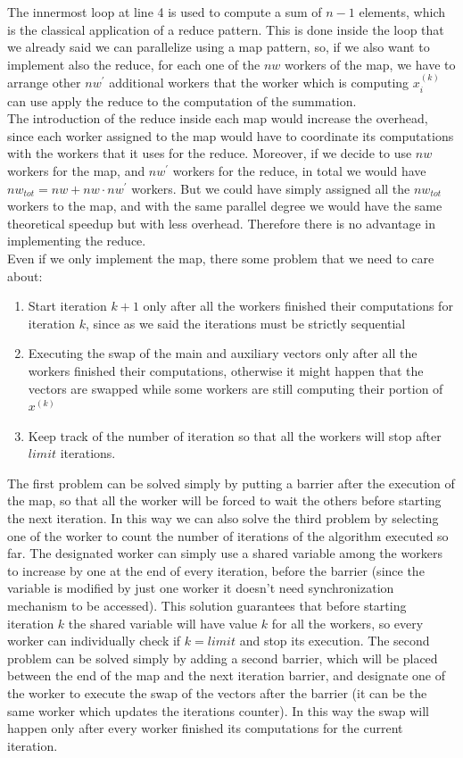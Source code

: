 \documentclass[12pt]{article}
\begin{document}
	The innermost loop at line 4 is used to compute a sum of $n-1$ elements, which is the classical application of a reduce pattern. This is done inside the loop that we already said we can parallelize using a map pattern, so, if we also want to implement also the reduce, for each one of the $nw$ workers of the map, we have to arrange other $nw^\prime$ additional workers that the worker which is computing $x_i^{(k)}$ can use apply the reduce to the computation of the summation. \\
	The introduction of the reduce inside each map would increase the overhead, since each worker assigned to the map would have to coordinate its computations with the workers that it uses for the reduce. Moreover, if we decide to use $nw$ workers for the map, and $nw^\prime$ workers for the reduce, in total we would have $nw_{tot} = nw + nw\cdot nw^\prime$ workers. But we could have simply assigned all the $nw_{tot}$ workers to the map, and with the same parallel degree we would have the same theoretical speedup but with less overhead. Therefore there is no advantage in implementing the reduce.\\
	Even if we only implement the map, there some problem that we need to care about:
	\begin{enumerate}
		\item Start iteration $k+1$ only after all the workers finished their computations for iteration $k$, since as we said the iterations must be strictly sequential 
		\item Executing the swap of the main and auxiliary vectors only after all the workers finished their computations, otherwise it might happen that the vectors are swapped while some workers are still computing their portion of $x^{(k)}$
		\item Keep track of the number of iteration so that all the workers will stop after $limit$ iterations. 
	\end{enumerate}
	The first problem can be solved simply by putting a barrier after the execution of the map, so that all the worker will be forced to wait the others before starting the next iteration. In this way we can also solve the third problem by selecting one of the worker to count the number of iterations of the algorithm executed so far. The designated worker can simply use a shared variable among the workers to increase by one at the end of every iteration, before the barrier (since the variable is modified by just one worker it doesn't need synchronization mechanism to be accessed). This solution guarantees that before starting iteration $k$ the shared variable will have value $k$ for all the workers, so every worker can individually check if $k = limit$ and stop its execution. The second problem can be solved simply by adding a second barrier, which will be placed between the end of the map and the next iteration barrier, and designate one of the worker to execute the swap of the vectors after the barrier (it can be the same worker which updates the iterations counter). In this way the swap will happen only after every worker finished its computations for the current iteration. 
	
\end{document}
